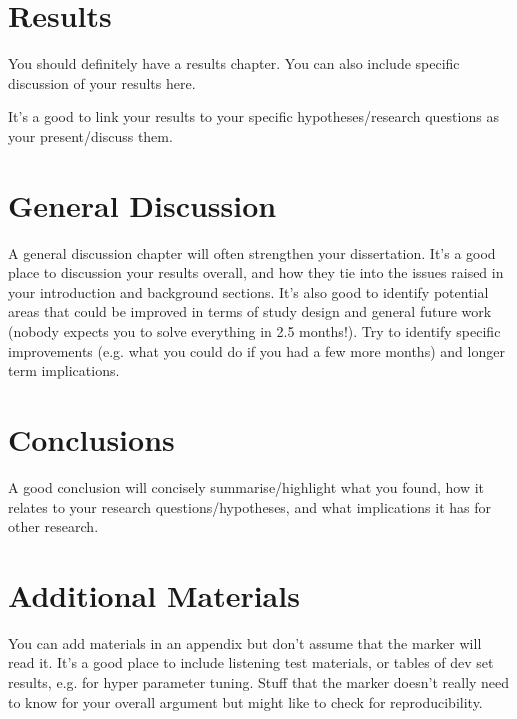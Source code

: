 \documentclass[msc,deptreport,slp]{infthesis} %
\begin{document}
\chapter{Results}

You should definitely have a results chapter.  You can also include specific discussion of your results here.

It's a good to link your results to your specific hypotheses/research questions as your present/discuss them. 

\chapter{General Discussion}

A general discussion chapter will often strengthen your dissertation.  It's a good place to discussion your results overall, and how they tie into the issues raised in your introduction and background sections.  It's also good to identify potential areas that could be improved in terms of study design and general future work (nobody expects you to solve everything in 2.5 months!).  Try to identify specific improvements (e.g. what you could do if you had a few more months) and longer term implications.

\chapter{Conclusions}

A good conclusion will concisely summarise/highlight what you found, how it relates to your research questions/hypotheses, and what implications it has for other research.





% 
% 
% 

\appendix

\chapter{Additional Materials}

You can add materials in an appendix but don't assume that the marker will read it.  It's a good place to include listening test materials, or tables of dev set results, e.g. for hyper parameter tuning.  Stuff that the marker doesn't really need to know for your overall argument but might like to check for reproducibility. 
\end{document}
